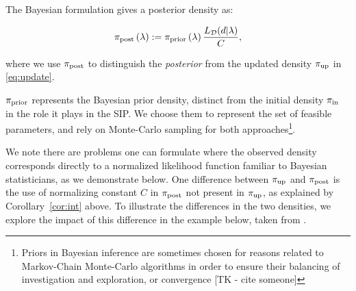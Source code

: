
The Bayesian formulation gives a posterior density as:

\begin{equation}\label{eq:sb_post}
    \operatorname*{\pi_{post}}\left ( \lambda \right ) := \operatorname*{\pi_{prior}}\left ( \lambda \right ) \frac{L_{\mathcal{D}} (d | \lambda)}{ C },
\end{equation}

where we use $\operatorname*{\pi_{post}}$ to distinguish the \emph{posterior} from the updated density $\operatorname*{\pi_{up}}$ in \eqref{eq:update}.

$\operatorname*{\pi_{prior}}$ represents the Bayesian prior density, distinct from the initial density $\operatorname*{\pi_{in}}$ in the role it plays in the SIP.
We choose them to represent the set of feasible parameters, and rely on Monte-Carlo sampling for both approaches\footnote{Priors in Bayesian inference are sometimes chosen for reasons related to Markov-Chain Monte-Carlo algorithms in order to ensure their balancing of investigation and exploration, or convergence [TK - cite someone]}.



We note there are problems one can formulate where the observed density corresponds directly to a normalized likelihood function familiar to Bayesian statisticians, as we demonstrate below.
One difference between $\operatorname*{\pi_{up}}$ and $\operatorname*{\pi_{post}}$ is the use of normalizing constant $C$ in $\operatorname*{\pi_{post}}$ not present in $\operatorname*{\pi_{up}}$, as explained by Corollary~\ref{cor:int} above.
To illustrate the differences in the two densities, we explore the impact of this difference in the example below, taken from \cite{BJW18}.

